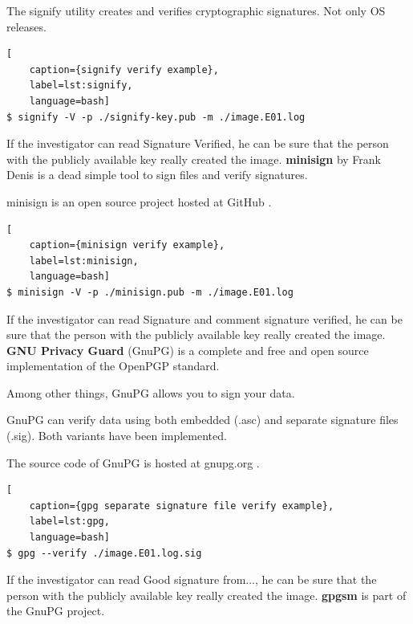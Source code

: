 The signify utility creates and verifies cryptographic signatures. Not only OS releases.

\begin{lstlisting}[
    caption={signify verify example},
    label=lst:signify,
    language=bash]
$ signify -V -p ./signify-key.pub -m ./image.E01.log
\end{lstlisting}

\noindent If the investigator can read \glqq{}Signature Verified\grqq{}, he can be sure that the person with the publicly available key really created the image.\newline
\newline
\noindent \textbf{minisign} by Frank Denis is a dead simple tool to sign files and verify signatures.

minisign is an open source project hosted at GitHub \cite{Minisign}.

\begin{lstlisting}[
    caption={minisign verify example},
    label=lst:minisign,
    language=bash]
$ minisign -V -p ./minisign.pub -m ./image.E01.log
\end{lstlisting}

\noindent If the investigator can read \glqq{}Signature and comment signature verified\grqq{}, he can be sure that the person with the publicly available key really created the image.\newline
\newline
\noindent \textbf{GNU Privacy Guard} (GnuPG) is a complete and free and open source implementation of the OpenPGP standard.

Among other things, GnuPG allows you to sign your data.

GnuPG can verify data using both embedded (.asc) and separate signature files (.sig). Both variants have been implemented.

The source code of GnuPG is hosted at gnupg.org \cite{GpgGit}.

\begin{lstlisting}[
    caption={gpg separate signature file verify example},
    label=lst:gpg,
    language=bash]
$ gpg --verify ./image.E01.log.sig
\end{lstlisting}

\noindent If the investigator can read \glqq{}Good signature from...\grqq{}, he can be sure that the person with the publicly available key really created the image.\newline
\newline
\noindent \textbf{gpgsm} is part of the GnuPG project.

